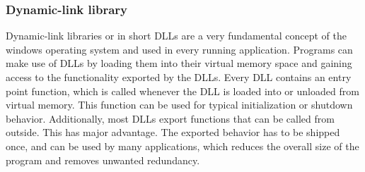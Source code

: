 \subsubsection{Dynamic-link library}
Dynamic-link libraries or in short DLLs are a very fundamental concept of the windows operating system and used in every running application. Programs can make use of DLLs by loading them into their virtual memory space and gaining access to the functionality exported by the DLLs. Every DLL contains an entry point function, which is called whenever the DLL is loaded into or unloaded from virtual memory. This function can be used for typical initialization or shutdown behavior. Additionally, most DLLs export functions that can be called from outside. This has major advantage. The exported behavior has to be shipped once, and can be used by many applications, which reduces the overall size of the program and removes unwanted redundancy.